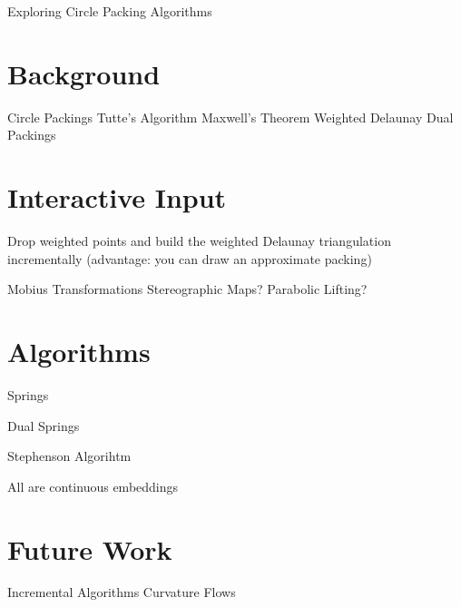 Exploring Circle Packing Algorithms

\section{Background} %
\label{sec:background}

  Circle Packings
  Tutte's Algorithm
  Maxwell's Theorem
  Weighted Delaunay
  Dual Packings


\section{Interactive Input} %
\label{sec:interactive_input}

  Drop weighted points and build the weighted Delaunay triangulation incrementally
  (advantage: you can draw an approximate packing)
  
  Mobius Transformations
  Stereographic Maps?
  Parabolic Lifting?
  

\section{Algorithms} %
\label{sec:algorithms}

  Springs
  
  Dual Springs
  
  Stephenson Algorihtm
  
  All are continuous embeddings


\section{Future Work} %
\label{sec:future_work}

  Incremental Algorithms
  Curvature Flows

